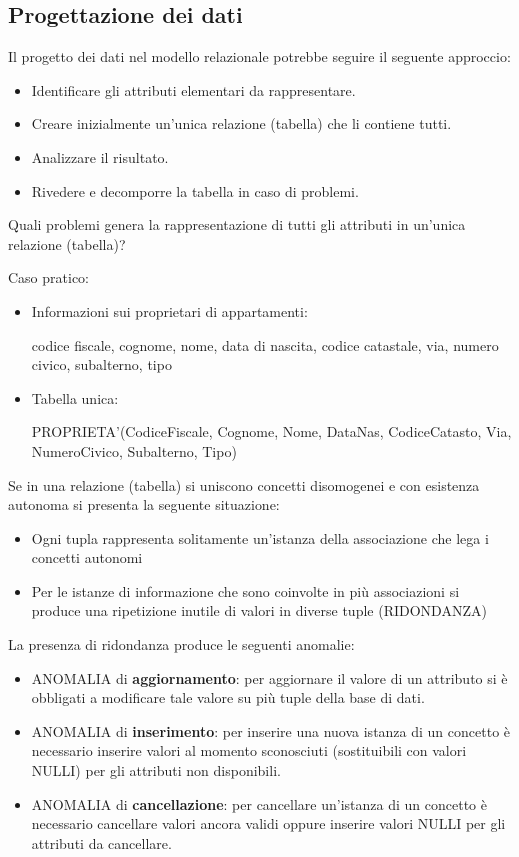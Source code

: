 \documentclass[a4paper, 10pt]{article}
\theoremstyle{definition}
\begin{document}
	\subsection{Progettazione dei dati}
		Il progetto dei dati nel modello relazionale potrebbe
		seguire il seguente approccio:
		\begin{itemize}
			\item Identificare gli attributi elementari da rappresentare.
			\item Creare inizialmente un'unica relazione (tabella) che
			li contiene tutti.
			\item Analizzare il risultato.
			\item Rivedere e decomporre la tabella in caso di problemi.
		\end{itemize}
		
		Quali problemi genera la rappresentazione di tutti gli attributi in un'unica relazione (tabella)?
		
		Caso pratico:
		\begin{itemize}
			\item Informazioni sui proprietari di appartamenti:
			
		 		codice fiscale, cognome, nome, data di nascita, codice
		 		catastale, via, numero civico, subalterno, tipo
		 		
		 	\item Tabella unica:
		 	
		 		PROPRIETA'(CodiceFiscale, Cognome, Nome, DataNas,
		 		CodiceCatasto, Via, NumeroCivico, Subalterno, Tipo)
		\end{itemize}

		Se in una relazione (tabella) si uniscono concetti
		disomogenei e con esistenza autonoma si presenta la
		seguente situazione:
		\begin{itemize}
			\item Ogni tupla rappresenta solitamente un'istanza della
			associazione che lega i concetti autonomi
			\item Per le istanze di informazione che sono coinvolte in più
			associazioni si produce una ripetizione inutile di valori in
			diverse tuple (RIDONDANZA)
		\end{itemize}

		La presenza di ridondanza produce le seguenti anomalie:
		\begin{itemize}
			\item ANOMALIA di \textbf{aggiornamento}: per aggiornare il valore di
			un attributo si è obbligati a modificare tale valore su più tuple
			della base di dati.
			\item ANOMALIA di \textbf{inserimento}: per inserire una nuova istanza
			di un concetto è necessario inserire valori al momento
			sconosciuti (sostituibili con valori NULLI) per gli attributi non
			disponibili.
			\item ANOMALIA di \textbf{cancellazione}: per cancellare un'istanza di un
			concetto è necessario cancellare valori ancora validi oppure
			inserire valori NULLI per gli attributi da cancellare.
		\end{itemize}
\end{document}
